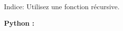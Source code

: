 \begin{Exercice}[15 minutes]
\begin{lstlisting}[language=Python]
    \end{lstlisting}

    \begin{conseil}
    Indice: Utilisez une fonction récursive.
    \end{conseil}

    \begin{solution}
        \textbf{Python :}
        
    \end{solution}

\end{Exercice}



